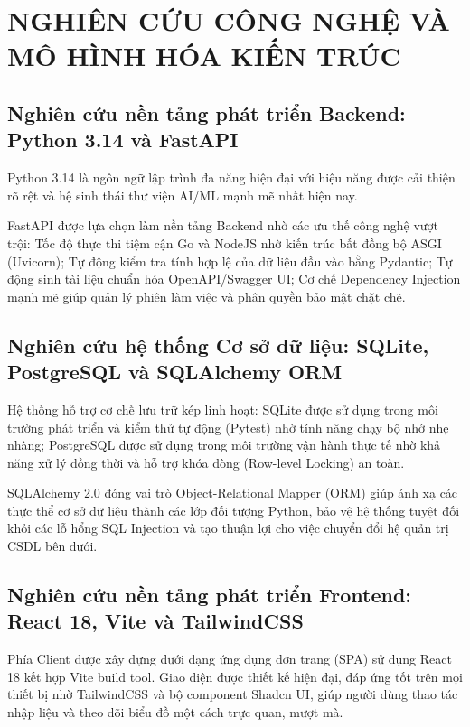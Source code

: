 \chapter{NGHIÊN CỨU CÔNG NGHỆ VÀ MÔ HÌNH HÓA KIẾN TRÚC}

\section{Nghiên cứu nền tảng phát triển Backend: Python 3.14 và FastAPI}

Python 3.14 là ngôn ngữ lập trình đa năng hiện đại với hiệu năng được cải thiện rõ rệt và hệ sinh thái thư viện AI/ML mạnh mẽ nhất hiện nay.

FastAPI được lựa chọn làm nền tảng Backend nhờ các ưu thế công nghệ vượt trội: Tốc độ thực thi tiệm cận Go và NodeJS nhờ kiến trúc bất đồng bộ ASGI (Uvicorn); Tự động kiểm tra tính hợp lệ của dữ liệu đầu vào bằng Pydantic; Tự động sinh tài liệu chuẩn hóa OpenAPI/Swagger UI; Cơ chế Dependency Injection mạnh mẽ giúp quản lý phiên làm việc và phân quyền bảo mật chặt chẽ.

\section{Nghiên cứu hệ thống Cơ sở dữ liệu: SQLite, PostgreSQL và SQLAlchemy ORM}

Hệ thống hỗ trợ cơ chế lưu trữ kép linh hoạt: SQLite được sử dụng trong môi trường phát triển và kiểm thử tự động (Pytest) nhờ tính năng chạy bộ nhớ nhẹ nhàng; PostgreSQL được sử dụng trong môi trường vận hành thực tế nhờ khả năng xử lý đồng thời và hỗ trợ khóa dòng (Row-level Locking) an toàn.

SQLAlchemy 2.0 đóng vai trò Object-Relational Mapper (ORM) giúp ánh xạ các thực thể cơ sở dữ liệu thành các lớp đối tượng Python, bảo vệ hệ thống tuyệt đối khỏi các lỗ hổng SQL Injection và tạo thuận lợi cho việc chuyển đổi hệ quản trị CSDL bên dưới.

\section{Nghiên cứu nền tảng phát triển Frontend: React 18, Vite và TailwindCSS}

Phía Client được xây dựng dưới dạng ứng dụng đơn trang (SPA) sử dụng React 18 kết hợp Vite build tool. Giao diện được thiết kế hiện đại, đáp ứng tốt trên mọi thiết bị nhờ TailwindCSS và bộ component Shadcn UI, giúp người dùng thao tác nhập liệu và theo dõi biểu đồ một cách trực quan, mượt mà.


